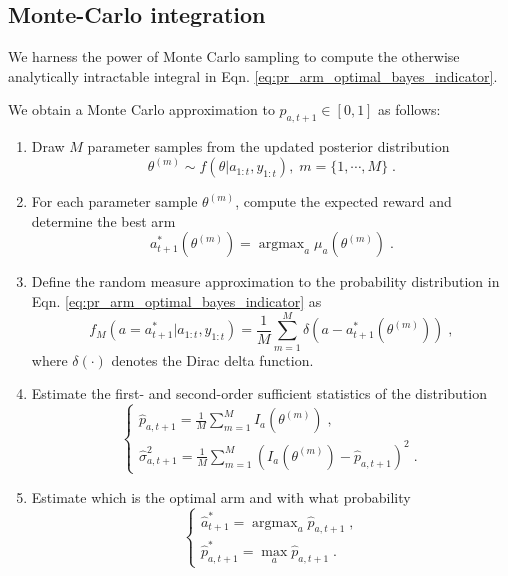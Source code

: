 \documentclass[10pt]{article}
\newcommand{\argmax}{\mathop{\mathrm{argmax}}}
\begin{document}
\subsection{Monte-Carlo integration}
\label{ssec:mc_integration}

We harness the power of Monte Carlo sampling to compute the otherwise analytically intractable integral in Eqn. \ref{eq:pr_arm_optimal_bayes_indicator}.

We obtain a Monte Carlo approximation to $p_{a,t+1}\in [0,1]$ as follows:
\begin{enumerate}
	\item Draw $M$ parameter samples from the updated posterior distribution
	\begin{equation}
	\theta^{(m)}\sim f(\theta|a_{1:t}, y_{1:t}), \; m=\{1, \cdots, M\} \; .
	\end{equation}
	\item For each parameter sample $\theta^{(m)}$, compute the expected reward and determine the best arm 
	\begin{equation}
	a_{t+1}^*(\theta^{(m)})=\argmax_{a}\mu_{a}(\theta^{(m)}) \; .
	\end{equation}
	\item Define the random measure approximation to the probability distribution in Eqn. \ref{eq:pr_arm_optimal_bayes_indicator} as
	\begin{equation}
	f_M(a =a_{t+1}^*|a_{1:t}, y_{1:t}) = \frac{1}{M} \sum_{m=1}^M \delta\left(a - a_{t+1}^*(\theta^{(m)}) \right) \; ,
	\label{eq:pr_arm_optimal_bayes_MC}
	\end{equation}
	where $\delta(\cdot)$ denotes the Dirac delta function.
	\item Estimate the first- and second-order sufficient statistics of the distribution
	\begin{equation}
	\begin{cases}
	\hat{p}_{a,t+1}=\frac{1}{M}\sum_{m=1}^M I_a\left(\theta^{(m)}\right) \; , \\
	\hat{\sigma}^2_{a,t+1}=\frac{1}{M} \sum_{m=1}^M \left(I_a\left(\theta^{(m)}\right)- \hat{p}_{a,t+1} \right)^2 \; .
	\end{cases}
	\label{eq:pr_arm_optimal_bayes_MC_suff_statistics}
	\end{equation}
	\item Estimate which is the optimal arm and with what probability
	\begin{equation}
	\begin{cases}
	\hat{a}_{t+1}^* =\argmax_{a} \hat{p}_{a,t+1} \; ,  \\
	\hat{p}^*_{a,t+1}=\max_{a} \hat{p}_{a,t+1} \; .
	\end{cases}
	\end{equation}
\end{enumerate}
\end{document}
